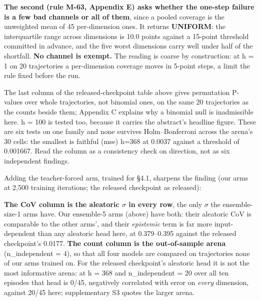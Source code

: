 \documentclass[10pt]{article}
\begin{document}
\textbf{The second (rule M-63, Appendix E) asks whether the one-step failure is a few bad channels or all of them}, since a pooled coverage is the unweighted mean of 45 per-dimension ones. It returns \textbf{UNIFORM}: the interquartile range across dimensions is 10.0 points against a 15-point threshold committed in advance, and the five worst dimensions carry well under half of the shortfall. \textbf{No channel is exempt.} The reading is coarse by construction: at h = 1 on 20 trajectories a per-dimension coverage moves in 5-point steps, a limit the rule fixed before the run.

The last column of the released-checkpoint table above gives permutation P-values over whole trajectories, not binomial ones, on the same 20 trajectories as the counts beside them; Appendix C explains why a binomial null is inadmissible here. h = 100 is tested too, because it carries the abstract's headline figure. These are six tests on one family and none survives Holm--Bonferroni across the arena's 30 cells: the smallest is faithful (mse) h=368 at 0.0037 against a threshold of 0.001667. Read the column as a consistency check on direction, not as six independent findings.


Adding the teacher-forced arm, trained for \S{}4.1, sharpens the finding (our arms at 2,500 training iterations; the released checkpoint as released):

\begin{center}\small{}\end{center}

\textbf{The CoV column is the aleatoric $\sigma$ in every row}, the only $\sigma$ the ensemble-size-1 arms have. Our ensemble-5 arms (above) have both: their aleatoric CoV is comparable to the other arms', and their \emph{epistemic} term is far more input-dependent than any aleatoric head here, at 0.379--0.395 against the released checkpoint's 0.0177. \textbf{The count column is the out-of-sample arena} (n\_independent = 4), so that all four models are compared on trajectories none of our arms trained on. For the released checkpoint's aleatoric head it is not the most informative arena: at h = 368 and n\_independent = 20 over all ten episodes that head is 0/45, negatively correlated with error on \emph{every} dimension, against 20/45 here; supplementary S3 quotes the larger arena.
\end{document}
